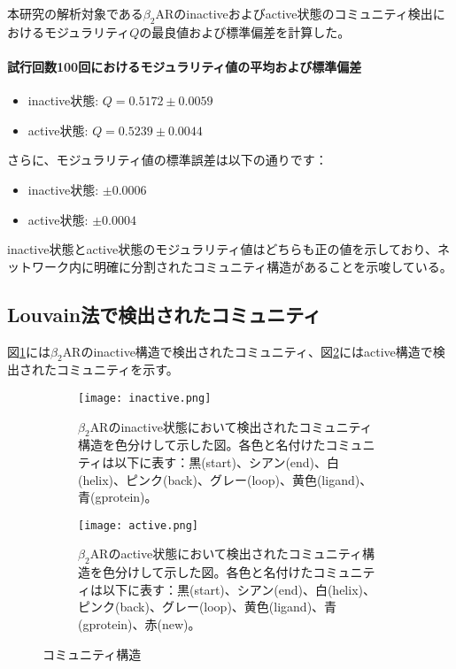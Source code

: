 本研究の解析対象である$\beta_2$ARのinactiveおよびactive状態のコミュニティ検出におけるモジュラリティ$Q$の最良値および標準偏差を計算した。

\paragraph{試行回数100回におけるモジュラリティ値の平均および標準偏差}
\begin{itemize}
    \item inactive状態: \( Q = 0.5172 \pm 0.0059 \)
    \item active状態: \( Q = 0.5239 \pm 0.0044 \)
\end{itemize}
さらに、モジュラリティ値の標準誤差は以下の通りです：
\begin{itemize}
    \item inactive状態: \( \pm 0.0006 \)
    \item active状態: \( \pm 0.0004 \)
\end{itemize}

inactive状態とactive状態のモジュラリティ値はどちらも正の値を示しており、ネットワーク内に明確に分割されたコミュニティ構造があることを示唆している。

\subsection{Louvain法で検出されたコミュニティ}

図\ref{fig:inactive_community}には$\beta_2$ARのinactive構造で検出されたコミュニティ、図\ref{fig:active_community}にはactive構造で検出されたコミュニティを示す。
\begin{figure}[htbp]
    \centering
    \begin{subfigure}{0.45\textwidth} %
      \centering
      \texttt{[image: inactive.png]}
      \caption{$\beta_2$ARのinactive状態において検出されたコミュニティ構造を色分けして示した図。各色と名付けたコミュニティは以下に表す：黒(start)、シアン(end)、白(helix)、ピンク(back)、グレー(loop)、黄色(ligand)、青(gprotein)。}
      \label{fig:inactive_community}
    \end{subfigure}
    \hspace{0.05\textwidth} %
    \begin{subfigure}{0.45\textwidth}
      \centering
      \texttt{[image: active.png]}
      \caption{$\beta_2$ARのactive状態において検出されたコミュニティ構造を色分けして示した図。各色と名付けたコミュニティは以下に表す：黒(start)、シアン(end)、白(helix)、ピンク(back)、グレー(loop)、黄色(ligand)、青(gprotein)、赤(new)。}
      \label{fig:active_community}
    \end{subfigure}
    \caption{コミュニティ構造}
    \label{fig:community-all}
  \end{figure}

